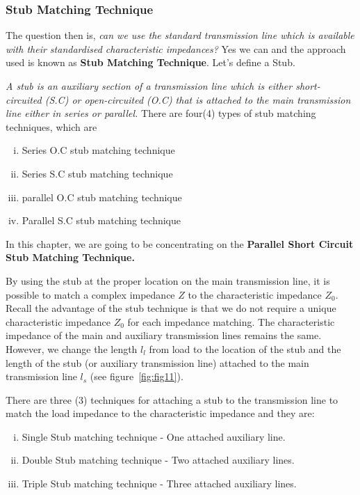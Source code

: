\subsubsection{Stub Matching Technique}
The question then is, \emph{can we use the standard transmission line which is available with their standardised characteristic impedances?} Yes we can and the approach used is known as \textbf{Stub Matching Technique}. Let's define a Stub.

\emph{A stub is an auxiliary section of a transmission line which is either short-circuited (S.C) or open-circuited (O.C) that is attached to the main transmission line either in series or parallel.} There are four(4) types of stub matching techniques, which are
\begin{enumerate}[(i)]
\item Series O.C stub matching technique
\item Series S.C stub matching technique
\item parallel O.C stub matching technique
\item Parallel S.C stub matching technique
\end{enumerate}
In this chapter, we are going to be concentrating on the \textbf{Parallel Short Circuit Stub Matching Technique.}

By using the stub at the proper location on the main transmission line, it is possible to match a complex impedance $Z$ to the characteristic impedance $Z_0$.
Recall the advantage of the stub technique is that we do not require a unique characteristic impedance $Z_0$ for each impedance matching. The characteristic impedance of the main and auxiliary transmission lines remains the same. However, we change the length $l_l$ from load to the location of the stub and the length of the stub (or auxiliary transmission line) attached to the main transmission line $l_s$ (see figure~\ref{fig:fig11}).

There are three (3) techniques for attaching a stub to the transmission line to match the load impedance to the characteristic impedance and they are:
\begin{enumerate}[(i)]
\item Single Stub matching technique - One attached auxiliary line.
\item Double Stub matching technique - Two attached auxiliary lines.
\item Triple Stub matching technique - Three attached auxiliary lines.
\end{enumerate}

